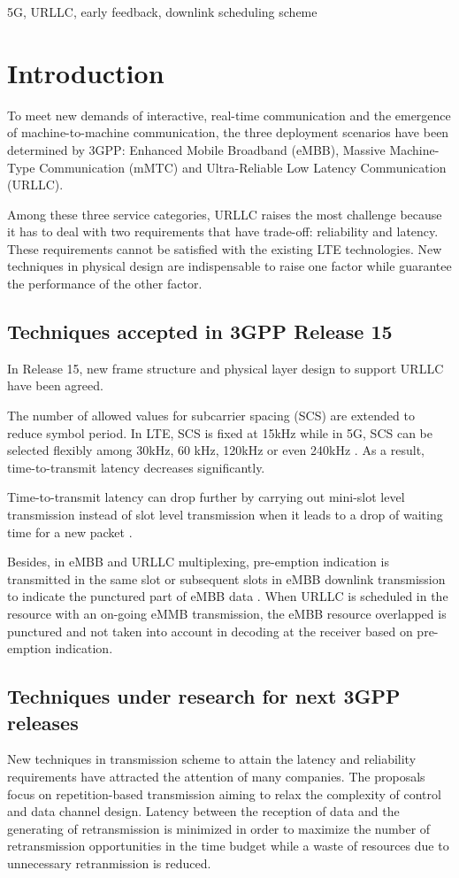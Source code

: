 \documentclass[conference]{IEEEtran}
\begin{document}
\begin{IEEEkeywords}
5G, URLLC, early feedback, downlink scheduling scheme 
\end{IEEEkeywords}

\section{Introduction}
To meet new demands of interactive, real-time communication and the emergence of machine-to-machine communication, the three deployment scenarios have been determined by 3GPP: Enhanced Mobile Broadband (eMBB), Massive Machine-Type Communication (mMTC) and Ultra-Reliable Low Latency Communication (URLLC). 

Among these three service categories, URLLC raises the most challenge because it has to deal with two requirements that have trade-off: reliability and latency. These requirements cannot be satisfied with the existing LTE technologies. New techniques in physical design are indispensable to raise one factor while guarantee the performance of the other factor.

\subsection{Techniques accepted in 3GPP Release 15}\label{IAA}
In Release 15, new frame structure and physical layer design to support URLLC have been agreed.

The number of allowed values for subcarrier spacing (SCS) are extended to reduce symbol period. In LTE, SCS is fixed at 15kHz while in 5G, SCS can be selected flexibly among 30kHz, 60 kHz, 120kHz or even 240kHz \cite{ad2}. As a result, time-to-transmit latency decreases significantly.

Time-to-transmit latency can drop further by carrying out mini-slot level transmission instead of slot level transmission when it leads to a drop of waiting time for a new packet \cite{ad3}.

Besides, in eMBB and URLLC multiplexing, pre-emption indication is transmitted in the same slot or subsequent slots in eMBB downlink transmission to indicate the punctured part of eMBB data \cite{ad4}. When URLLC is scheduled in the resource with an on-going eMMB transmission, the eMBB resource overlapped is punctured and not taken into account in decoding at the receiver based on pre-emption indication. 

\subsection{Techniques under research for next 3GPP releases}\label{IBB}
New techniques in transmission scheme to attain the latency and reliability requirements have attracted the attention of many companies. The proposals focus on repetition-based transmission aiming to relax the complexity of control and data channel design. Latency between the reception of data and the generating of retransmission is minimized in order to maximize the number of retransmission opportunities in the time budget while a waste of resources due to unnecessary retranmission is reduced.
\end{document}
